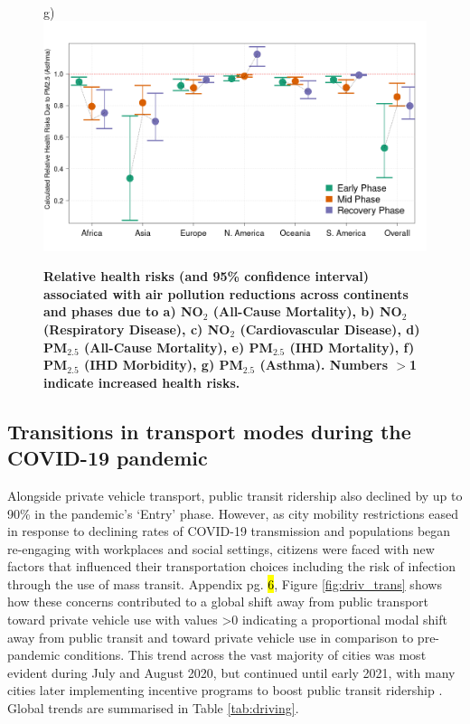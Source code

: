 \documentclass[preprint,10pt]{elsarticle} %
\begin{document}
\begin{figure}
\\
\scriptsize{g)}\includegraphics[trim={0 0 25 23},clip,scale=0.23]{Images/pm25Ast_20250207.png}
\caption{\bf Relative health risks (and 95\% confidence interval) associated with air pollution reductions across continents and phases due to 
a) NO$_{2}$ (All-Cause Mortality), 
b) NO$_{2}$ (Respiratory Disease), 
c) NO$_{2}$ (Cardiovascular Disease), 
d) PM$_{2.5}$ (All-Cause Mortality), 
e) PM$_{2.5}$ (IHD Mortality),
f) PM$_{2.5}$ (IHD Morbidity),
g) PM$_{2.5}$ (Asthma). Numbers $>$1 indicate increased health risks.}
 \label{fig:risks}
\end{figure}



\subsection*{Transitions in transport modes during the COVID-19 pandemic}

Alongside private vehicle transport, public transit ridership also declined by up to 90\% in the pandemic's `Entry' phase\cite{TransitCovid_Gkiotsalitis}. However, as city mobility restrictions eased in response to declining rates of COVID-19 transmission and populations began re-engaging with workplaces and social settings, citizens were faced with new factors that influenced their transportation choices including the risk of infection through the use of mass transit\cite{BECKTransit}. Appendix pg. \hl{6}, Figure \ref{fig:driv_trans} shows how these concerns contributed to a global shift away from public transport toward private vehicle use with values \textgreater 0 indicating a proportional modal shift away from public transit and toward private vehicle use in comparison to pre-pandemic conditions. This trend across the vast majority of cities was most evident during July and August 2020, but continued until early 2021, with many cities later implementing incentive programs to boost public transit ridership \cite{dai2021improving}. Global trends are summarised in Table \ref{tab:driving}.
\end{document}
